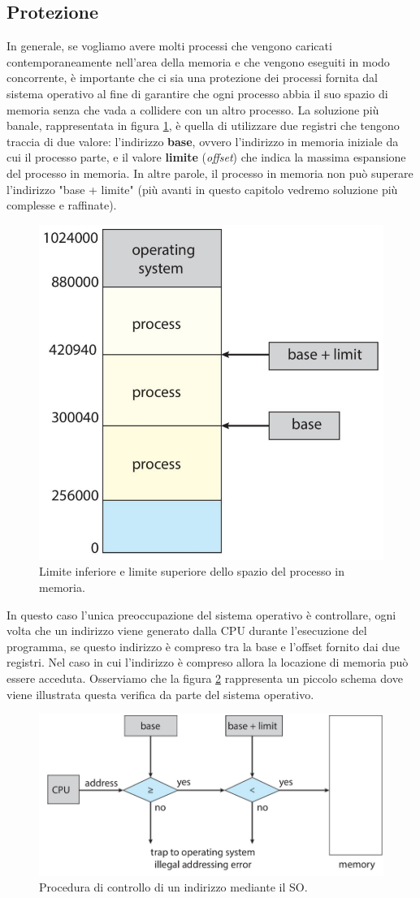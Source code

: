 % 
\subsection{Protezione}
In generale, se vogliamo avere molti processi che vengono caricati contemporaneamente nell'area della memoria e che vengono eseguiti in modo concorrente, è importante che ci sia una protezione dei processi fornita dal sistema operativo al fine di garantire che ogni processo abbia il suo spazio di memoria senza che vada a collidere con un altro processo. La soluzione più banale, rappresentata in figura \ref{fig:process_protection}, è quella di utilizzare due registri che tengono traccia di due valore: l'indirizzo \textbf{base}, ovvero l'indirizzo in memoria iniziale da cui il processo parte, e il valore \textbf{limite} (\textit{offset}) che indica la massima espansione del processo in memoria. In altre parole, il processo in memoria non può superare l'indirizzo "base + limite" (più avanti in questo capitolo vedremo soluzione più complesse e raffinate).
\begin{figure}[h]
    \centering
    \includegraphics[width = .35\textwidth]{../res/imgs/main memory/process_protection.png}
    \caption{Limite inferiore e limite superiore dello spazio del processo in memoria.}
    \label{fig:process_protection}
\end{figure}
In questo caso l'unica preoccupazione del sistema operativo è controllare, ogni volta che un indirizzo viene generato dalla CPU durante l'esecuzione del programma, se questo indirizzo è compreso tra la base e l'offset fornito dai due registri. Nel caso in cui l'indirizzo è compreso allora la locazione di memoria può essere acceduta. Osserviamo che la figura \ref{fig:can_access} rappresenta un piccolo schema dove viene illustrata questa verifica da parte del sistema operativo.
\begin{figure}[h]
    \centering
    \includegraphics[width = .6\textwidth]{../res/imgs/main memory/can_access.png}
    \caption{Procedura di controllo di un indirizzo mediante il SO.}
    \label{fig:can_access}
\end{figure}

